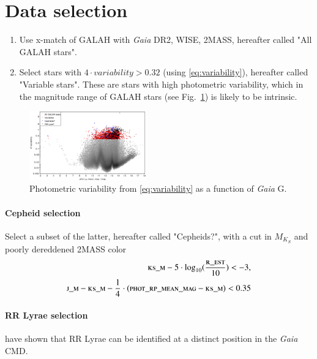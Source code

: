 \documentclass[]{aa}
\begin{document}
\section{Data selection} \label{sec:selection}

\begin{enumerate}
	\item Use x-match of GALAH with \textit{Gaia} DR2, WISE, 2MASS, hereafter called "All GALAH stars".
	\item Select stars with $4\cdot variability > 0.32$ (using \autoref{eq:variability}), hereafter called "Variable stars". These are stars with high photometric variability, which in the magnitude range of GALAH stars (see Fig.~\ref{fig:figure1}) is likely to be intrinsic.
\end{enumerate}

\begin{figure}[h!]
\centering
  \includegraphics[width=0.45\textwidth]{Figures/variability_gmag.pdf}
    \caption{Photometric variability from \autoref{eq:variability} as a function of \textit{Gaia} G.}
    \label{fig:figure1}
\end{figure}

\paragraph{Cepheid selection}
Select a subset of the latter, hereafter called "Cepheids?", with a cut in $M_{K_S}$ and poorly dereddened 2MASS color
\begin{align} \label{eq:cepheids}
	\textsc{ks\_m} - 5 \cdot \log_{10}(\frac{\textsc{r\_est}}{10}) < -3, \\
	\textsc{j\_m} - \textsc{ks\_m} - \frac{1}{4} \cdot (\textsc{phot\_rp\_mean\_mag} - \textsc{ks\_m}) < 0.35
\end{align}

\paragraph{RR Lyrae selection}

\cite{Eyer2018} have shown that RR Lyrae can be identified at a distinct position in the \textit{Gaia} CMD.
\end{document}
